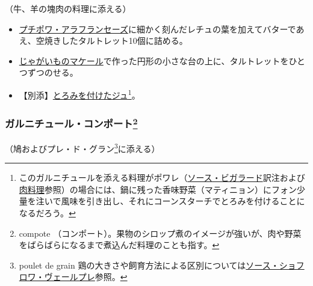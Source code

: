 \begin{recette}
（牛、羊の塊肉の料理に添える）

\begin{itemize}
\item
  \protect\hyperlink{petits-pois-francaise}{プチポワ・アラフランセーズ}に細かく刻んだレチュの葉を加えてバターであえ、空焼きしたタルトレット10個に詰める。
\item
  \protect\hyperlink{pommes-de-terre-macaire}{じゃがいものマケール}で作った円形の小さな台の上に、タルトレットをひとつずつのせる。
\item
  【別添】\protect\hyperlink{jus-de-veau-lie}{とろみを付けたジュ}\footnote{このガルニチュールを添える料理がポワレ（\protect\hyperlink{sauce-bigarade}{ソース・ビガラード}訳注および\protect\hyperlink{releves-et-entrees}{肉料理}参照）の場合には、鍋に残った香味野菜（マティニョン）にフォン少量を注いで風味を引き出し、それにコーンスターチでとろみを付けることになるだろう。}。
\end{itemize}

\atoaki{}

\hypertarget{garniture-de-compote}{%
\subsubsection[ガルニチュール・コンポート]{\texorpdfstring{ガルニチュール・コンポート\footnote{compote
  （コンポート）。果物のシロップ煮のイメージが強いが、肉や野菜をばらばらになるまで煮込んだ料理のことも指す。}}{ガルニチュール・コンポート}}\label{garniture-de-compote}}



（鳩およびプレ・ド・グラン\footnote{poulet de grain
  鶏の大きさや飼育方法による区別については\protect\hyperlink{sauce-chaud-froid-vert-pre}{ソース・ショフロワ・ヴェールプレ}参照。}に添える）


\end{recette}
